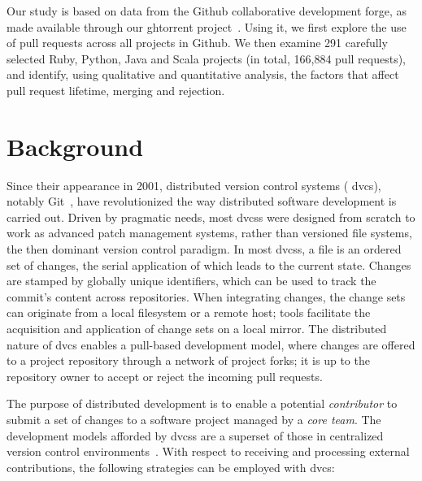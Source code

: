 \documentclass{sig-alternate}
\begin{document}
Our study is based on data from the Github collaborative development forge, as
made available through our {\sc ght}orrent project~\cite{G13}. Using it, we
first explore the use of pull requests across all projects in Github. We then
examine 291 carefully selected Ruby, Python, Java and Scala projects (in total,
166,884 pull requests), and identify, using  
qualitative and quantitative analysis, the
factors that affect pull request lifetime, merging and rejection. 

\section{Background} \label{sec:bg}

Since their appearance in 2001, distributed version control systems ({\sc
dvcs}), notably Git~\cite{Chaco09}, have revolutionized the way distributed
software development is carried out. Driven by pragmatic needs, most {\sc dvcs}s
were designed from scratch to work as advanced patch management systems, rather
than versioned file systems, the then dominant version control paradigm. In most
{\sc dvcs}s, a file is an ordered set of changes, the serial application of
which leads to the current state. Changes are stamped by globally unique
identifiers, which can be used to track the commit's content across
repositories. When integrating changes, the change sets can originate from a
local filesystem or a remote host; tools facilitate the acquisition and
application of change sets on a local mirror. The distributed nature of {\sc
dvcs} enables a pull-based development model, where changes are offered to a
project repository through a network of project forks; it is up to the
repository owner to accept or reject the incoming pull requests.

The purpose of distributed development is to enable a potential
\emph{contributor} to submit a set of changes to a software project managed by a
\emph{core team}. The development models afforded by {\sc dvcs}s are a superset
of those in centralized version control environments~\cite{Shiha12,Bird09}.
With respect to receiving and processing external contributions, the following
strategies can be employed with {\sc dvc}s:
\end{document}
